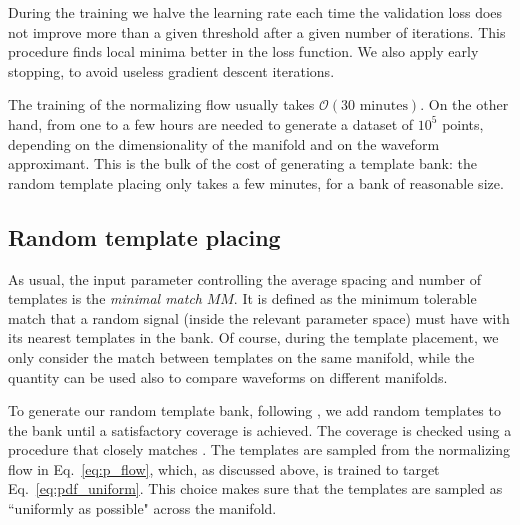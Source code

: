 \documentclass[twocolumn,showpacs,preprintnumbers,nofootinbib,prd,
superscriptaddress,10pt]{revtex4-2}
\begin{document}
During the training we halve the learning rate each time the validation loss does not improve more than a given threshold after a given number of iterations. This procedure finds local minima better in the loss function. We also apply early stopping, to avoid useless gradient descent iterations.

The training of the normalizing flow usually takes $\mathcal{O}(30 \text{ minutes})$. On the other hand, from one to a few hours are needed to generate a dataset of $10^5$ points, depending on the dimensionality of the manifold and on the waveform approximant.
This is the bulk of the cost of generating a template bank: the random template placing only takes a few minutes, for a bank of reasonable size.

\subsection{Random template placing} \label{sec:template_placing}

As usual, the input parameter controlling the average spacing and number of templates is the {\it minimal match} $MM$. It is defined as the minimum tolerable match that a random signal (inside the relevant parameter space) must have with its nearest templates in the bank.
Of course, during the template placement, we only consider the match between templates on the same manifold, while the quantity can be used also to compare waveforms on different manifolds.

To generate our random template bank, following \cite{Messenger:2008ta}, we add random templates to the bank until a satisfactory coverage is achieved. The coverage is checked using a procedure that closely matches \cite{Coogan:2022qxs}.
The templates are sampled from the normalizing flow in Eq.~\eqref{eq:p_flow}, which, as discussed above, is trained to target Eq.~\eqref{eq:pdf_uniform}. This choice makes sure that the templates are sampled as ``uniformly as possible" across the manifold.
\end{document}
